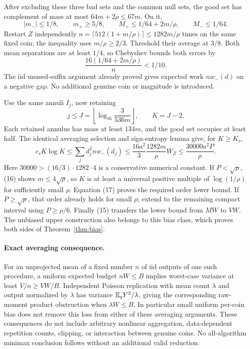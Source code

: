 After excluding these three bad sets and the common null sets, the good set
has complement of mass at most $64m+2\rho\le67m$. On it,
\[
 |m_-|\le1/8,\qquad m_+\ge5/8,\qquad
 M_+\le1/64+2m/\rho,\qquad M_-\le1/64.
\]
Restart $Z$ independently
$n=\lceil512(1+m/\rho)\rceil\le1282m/\rho$ times on the same fixed coin;
the inequality uses $m/\rho\ge2/3$. Threshold their average at $3/8$.
Both mean separations are at least $1/4$, so Chebyshev bounds both errors by
\[
 \frac{16(1/64+2m/\rho)}{n}<1/10.
\]
The iid unused-suffix argument already proved gives expected work $nw_-(d)$
on a negative gap. No additional genuine coin or magnitude is introduced.

Use the same annuli $I_j$, now retaining
\[
 j\le J=\left\lfloor\log_{16}\frac3{536m}\right\rfloor,
 \qquad K=J-2.
\]
Each retained annulus has mass at least $134m$, and the good set occupies at
least half. The identical averaging selection and sign-entropy lemma give,
for $K\ge K_s$,
\[
 c_sK\log K
 \le\sum_jd_j^2nw_-(d_j)
 \le\frac{16a^2}{3}\frac{1282m}{\rho}W_Z
 \le\frac{30000a^2P}{\rho}.                             \tag{17}
\]
Here $30000>(16/3)\cdot1282\cdot4$ is a conservative numerical constant.
If $P<\sqrt\rho$, (16) shows $m\le4\sqrt\rho$, so $K$ is at least a
universal positive multiple of $\log(1/\rho)$ for sufficiently small $\rho$.
Equation (17) proves the required order lower bound. If $P\ge\sqrt\rho$,
that order already holds for small $\rho$; extend to the remaining compact
interval using $P\ge\rho/6$. Finally (15) transfers the lower bound from
$MW$ to $VW$. The unbiased upper construction also belongs to this bias class,
which proves both sides of Theorem~\ref{thm:bias}.

\paragraph{Exact averaging consequence.}
For an unprojected mean of a fixed number $n$ of iid outputs of one such
procedure, a uniform expected budget $nW\le B$ implies worst-case variance
at least $V/n\ge VW/B$. Independent Poisson replication with mean count
$\lambda$ and output normalized by $\lambda$ has variance
$\mathbb E_qY^2/\lambda$, giving the corresponding raw-moment product obstruction
when $\lambda W\le B$. In particular small uniform per-coin bias does not
remove this loss from either of these averaging arguments.
These consequences do not include arbitrary nonlinear aggregation,
data-dependent repetition counts, clipping, or interaction between genuine
coins. No all-algorithm minimax conclusion follows without an additional
valid reduction.

